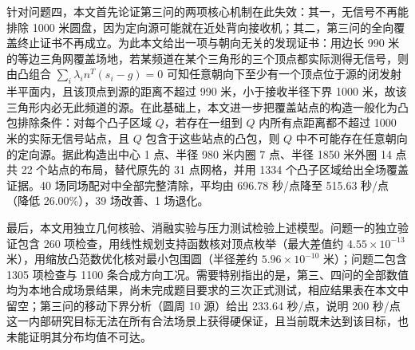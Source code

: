 针对问题四，本文首先论证第三问的两项核心机制在此失效：其一，无信号不再能排除 1000 米圆盘，因为定向源可能就在近处背向接收机；其二，第三问的全向覆盖终止证书不再成立。为此本文给出一项与朝向无关的发现证书：用边长 990 米的等边三角网覆盖场地，若某频道在某个三角形的三个顶点都实际测得无信号，则由凸组合 $\sum_i\lambda_in^{T}(s_i-g)=0$ 可知任意朝向下至少有一个顶点位于源的闭发射半平面内，且该顶点到源的距离不超过 990 米，小于接收半径下界 1000 米，故该三角形内必无此频道的源。在此基础上，本文进一步把覆盖站点的构造一般化为凸包排除条件：对每个凸子区域 $Q$，若存在一组到 $Q$ 内所有点距离都不超过 1000 米的实际无信号站点，且 $Q$ 包含于这些站点的凸包，则 $Q$ 中不可能存在任意朝向的定向源。据此构造出中心 1 点、半径 980 米内圈 7 点、半径 1850 米外圈 14 点共 22 个站点的布局，替代原先的 31 点网格，并用 1334 个凸子区域给出全场覆盖证据。40 场同场配对中全部完整清除，平均由 696.78 秒/点降至 515.63 秒/点（降低 26.00\%），39 场改善、1 场退化。

最后，本文用独立几何核验、消融实验与压力测试检验上述模型。问题一的独立验证包含 260 项检查，用线性规划支持函数核对顶点枚举（最大差值约 $4.55\times10^{-13}$ 米），用缩放凸范数优化核对最小包围圆（半径差约 $5.96\times10^{-10}$ 米）；问题二包含 1305 项检查与 1100 条合成方向工况。需要特别指出的是，第三、四问的全部数值均为本地合成场景结果，尚未完成题目要求的三次正式测试，相应结果表在本文中留空；第三问的移动下界分析（圆周 10 源）给出 233.64 秒/点，说明 200 秒/点这一内部研究目标无法在所有合法场景上获得硬保证，且当前既未达到该目标，也未能证明其分布均值不可达。
